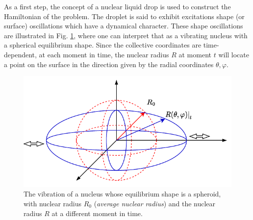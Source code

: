 As a first step, the concept of a nuclear liquid drop is used to construct the Hamiltonian of the problem. The droplet is said to exhibit excitations shape (or surface) oscillations which have a dynamical character. These shape oscillations are illustrated in Fig. \ref{fig-nuclear-vibration}, where one can interpret that as a vibrating nucleus with a spherical equilibrium shape. Since the collective coordinates are time-dependent, at each moment in time, the nuclear radius $R$ at moment $t$ will locate a point on the surface in the direction given by the radial coordinates $\theta,\varphi$.
\begin{figure}
    \centering
    \includegraphics[scale=1.1]{Chapters/Figures/shape_oscillations.pdf}
    \caption{The vibration of a nucleus whose equilibrium shape is a spheroid, with nuclear radius $R_0$ (\emph{average nuclear radius}) and the nuclear radius $R$ at a different moment in time.}
    \label{fig-nuclear-vibration}
\end{figure}


